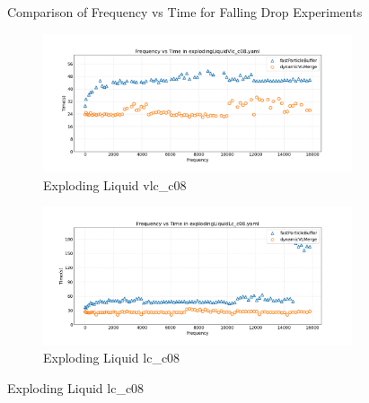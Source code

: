 \begin{figure}[htbp]
    \vspace{1em}
    \caption{Comparison of Frequency vs Time for Falling Drop Experiments}
    \label{fig:mainFallingDrop}
\end{figure}


\begin{figure}[htbp]
    \centering
    \vspace{-0.5em}
    \begin{subfigure}[b]{\textwidth}
        \centering
        \includegraphics[width=0.9\linewidth]{graphs/explodingLiquid/normalExperiments/freq/vlcc08.png}
        \vspace{-0.5em}
        \caption{\scriptsize Exploding Liquid vlc\_c08}
        \label{fig:vlcc08explodingLiquid}
    \end{subfigure}

    \begin{subfigure}[b]{\textwidth}
        \centering
        \includegraphics[width=0.9\linewidth]{graphs/explodingLiquid/normalExperiments/freq/lcc08.png}
        \vspace{-0.5em}
        \caption{\scriptsize Exploding Liquid lc\_c08}
        \label{fig:lcc08explodingLiquid}
    \end{subfigure}


\end{figure}
